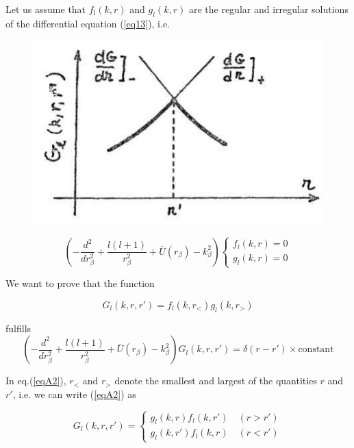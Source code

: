 \documentclass[a4paper,14pt]{book}
\begin{document}
Let us assume that $f_l(k,r)$ and $g_l(k,r)$ are the regular and irregular solutions of the differential equation (\ref{eq13}), i.e.

\begin{figure}
\centerline{\includegraphics*[width=\textwidth]{figs_C4/3_1}}
\caption{}\label{fig3rd_1}
\end{figure}
 \begin{equation}\label{eqA1}
\left( -\frac{d^2}{dr^2_\beta}+\frac{l(l+1)}{r^2_\beta}+\bar U (r_ \beta)-k_\beta^2\right)
\left \lbrace \begin{aligned}
f_l(k,r)=0\\
g_l(k,r)=0
\end{aligned}
\right.
\end{equation}

We want to prove that the function

 \begin{equation}\label{eqA2}
G_l(k,r,r')=f_l(k,r_<)g_l(k,r_>)
\end{equation}

fulfills
 \begin{equation}\label{eqA3}
\left( -\frac{d^2}{dr^2_\beta}+\frac{l(l+1)}{r^2_\beta}+\bar U (r_ \beta)-k_\beta^2\right) G_l(k,r,r')=
\delta(r-r')\times \text{constant}
\end{equation}

In eq.(\ref{eqA2}), $r_<$ and $r_>$ denote the smallest and largest of the quantities $r$ and $r'$, i.e. we can write (\ref{eqA2}) as

 \begin{equation}\label{eqA4}
G_l(k,r,r')=
\left \lbrace \begin{aligned}
g_l(k,r)f_l(k,r') \quad (r>r')\\
g_l(k,r')f_l(k,r) \quad (r<r')\end{aligned}
\right.
\end{equation}
\end{document}
